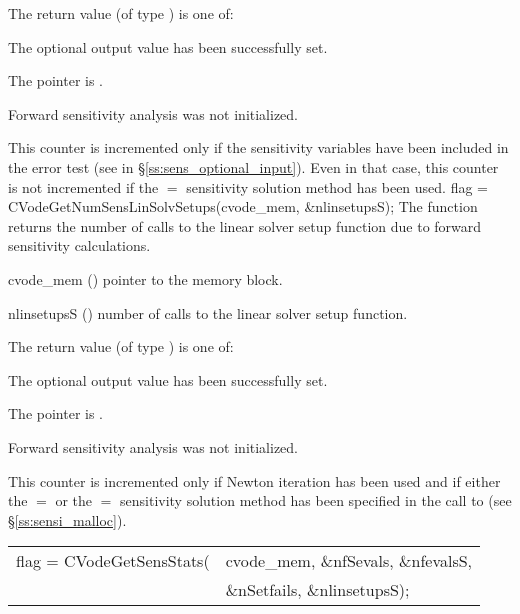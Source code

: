 {
  The return value  (of type ) is one of:
  \begin{args}
  \item[\Id{CV\_SUCCESS}] 
    The optional output value has been successfully set.
  \item[\Id{CV\_MEM\_NULL}]
    The  pointer is .
  \item[\Id{CV\_NO\_SENS}]
    Forward sensitivity analysis was not initialized.
  \end{args}
}
{
  This counter is incremented only if the sensitivity variables have been included
  in the error test (see  in \S\ref{ss:sens_optional_input}). 
  Even in that case, this counter is not incremented if the $=$ 
  sensitivity solution method has been used.
}
{
  flag = CVodeGetNumSensLinSolvSetups(cvode\_mem, \&nlinsetupsS);
}
{
  The function  returns the number of calls
  to the linear solver setup function due to forward sensitivity calculations.
}
{
  \begin{args}
  \item[cvode\_mem] ()
    pointer to the {\cvodes} memory block.
  \item[nlinsetupsS] ()
    number of calls to the linear solver setup function.
  \end{args}
}
{
  The return value  (of type ) is one of:
  \begin{args}
  \item[\Id{CV\_SUCCESS}] 
    The optional output value has been successfully set.
  \item[\Id{CV\_MEM\_NULL}]
    The  pointer is .
  \item[\Id{CV\_NO\_SENS}]
    Forward sensitivity analysis was not initialized.
  \end{args}
}
{
  This counter is incremented only if Newton iteration has been used and if
  either the $=$ or the $=$ sensitivity
  solution method has been specified in the call to 
  (see \S\ref{ss:sensi_malloc}).
}
{
  \begin{tabular}[t]{@{}r@{}l@{}}
    flag = CVodeGetSensStats(&cvode\_mem, \&nfSevals, \&nfevalsS, \\
                             &\&nSetfails, \&nlinsetupsS);
  \end{tabular}
}
